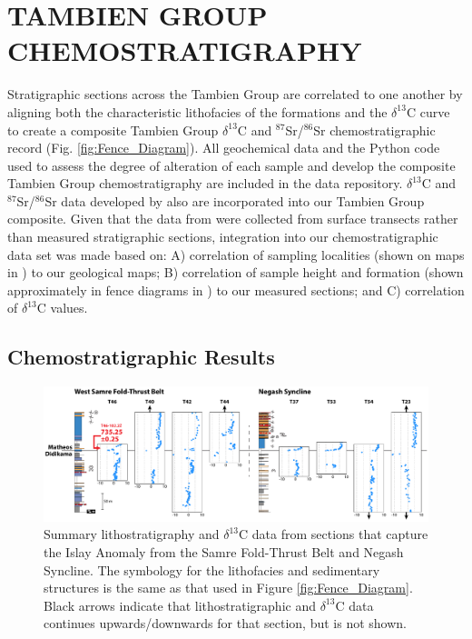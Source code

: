 \documentclass[11pt,letterpaper]{article}
\newcommand{\dC}{$\delta^{13}$C\xspace}
\newcommand{\SrSr}{$^{87}$Sr/$^{86}$Sr\xspace}
\begin{document}
\section*{TAMBIEN GROUP CHEMOSTRATIGRAPHY \label{sec:TAMBIENGROUPCHEMOSTRATIGRAPHY}}

Stratigraphic sections across the Tambien Group are correlated to one another by aligning both the characteristic lithofacies of the formations and the \dC curve to create a composite Tambien Group \dC and \SrSr chemostratigraphic record (Fig. \ref{fig:Fence_Diagram}). All geochemical data and the Python code used to assess the degree of alteration of each sample and develop the composite Tambien Group chemostratigraphy are included in the data repository. \dC and \SrSr data developed by \citet{Miller2009a} also are incorporated into our Tambien Group composite. Given that the data from \citet{Miller2009a} were collected from surface transects rather than measured stratigraphic sections, integration into our chemostratigraphic data set was made based on: A) correlation of sampling localities (shown on maps in \citealp{Miller2009a}) to our geological maps; B) correlation of sample height and formation (shown approximately in fence diagrams in \citealp{Miller2009a}) to our measured sections; and C) correlation of \dC values.

\subsection*{Chemostratigraphic Results \label{sec:ChemostratigraphicResults}}

\begin{figure}[h!]
\begin{center}
	\includegraphics[width=\textwidth]{Figures/Islay_Anomaly_Sections.pdf}
	\caption{Summary lithostratigraphy and \dC data from sections that capture the Islay Anomaly from the Samre Fold-Thrust Belt and Negash Syncline. The symbology for the lithofacies and sedimentary structures is the same as that used in Figure \ref{fig:Fence_Diagram}. Black arrows indicate that lithostratigraphic and \dC data continues upwards/downwards for that section, but is not shown.}
	\label{fig:Islay_Anomaly_Sections}
\end{center}
\end{figure}
\end{document}
